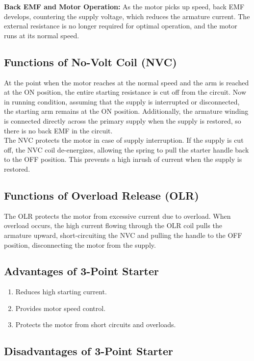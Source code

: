 \documentclass[a4paper,12pt]{article}
\begin{document}
\textbf{Back EMF and Motor Operation:}
	As the motor picks up speed, back EMF develops, countering the supply voltage, which reduces the armature current. The external resistance is no longer required for optimal operation, and the motor runs at its normal speed. 
	

\subsection{Functions of No-Volt Coil (NVC)}
At the point when the motor reaches at the normal speed and the arm is reached at the ON position, the entire starting resistance is cut off from the circuit. Now in running condition, assuming that the supply is interrupted or disconnected, the starting arm remains at the ON position. Additionally, the armature winding is connected directly across the primary supply when the supply is restored, so there is no back EMF in the circuit.\\
The NVC protects the motor in case of supply interruption. If the supply is cut off, the NVC coil de-energizes, allowing the spring to pull the starter handle back to the OFF position. This prevents a high inrush of current when the supply is restored.
	
	\subsection{Functions of Overload Release (OLR)}
	
	The OLR protects the motor from excessive current due to overload. When overload occurs, the high current flowing through the OLR coil pulls the armature upward, short-circuiting the NVC and pulling the handle to the OFF position, disconnecting the motor from the supply.
	
	\subsection{Advantages of 3-Point Starter}
	
	\begin{enumerate}
		\item Reduces high starting current.
		\item Provides motor speed control.
		\item Protects the motor from short circuits and overloads.
	\end{enumerate}
	
	\subsection{Disadvantages of 3-Point Starter}
	
\end{document}
